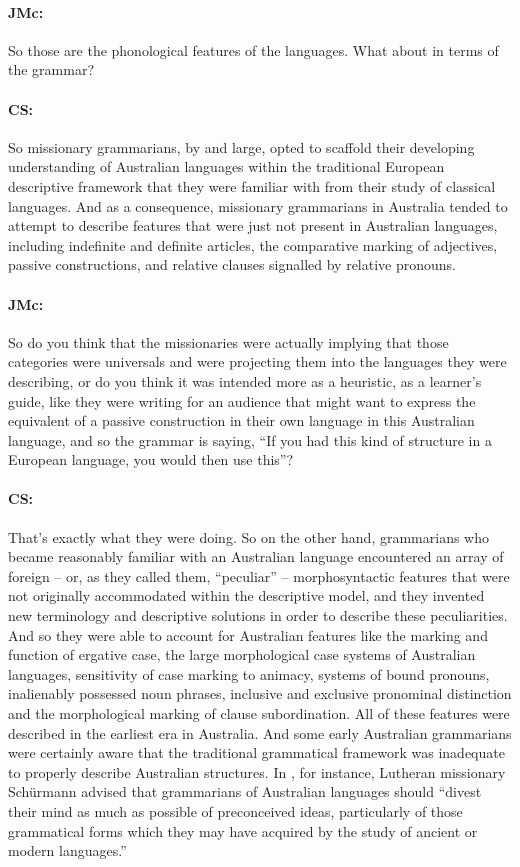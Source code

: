 \documentclass[output=paper]{langscibook}
\begin{document}
\paragraph*{JMc:}  So those are the phonological features of the languages. What about in terms of the grammar?


\paragraph*{CS:}  So missionary grammarians, by and large, opted to scaffold their developing understanding of Australian languages within the traditional European descriptive framework that they were familiar with from their study of classical languages. And as a consequence, missionary grammarians in Australia tended to attempt to describe features that were just not present in Australian languages, including indefinite and definite articles, the comparative marking of adjectives, passive constructions, and relative clauses signalled by relative pronouns.


\paragraph*{JMc:}  So do you think that the missionaries were actually implying that those categories were universals and were projecting them into the languages they were describing, or do you think it was intended more as a heuristic, as a learner’s guide, like they were writing for an audience that might want to express the equivalent of a passive construction in their own language in this Australian language, and so the grammar is saying, “If you had this kind of structure in a European language, you would then use this”?


\paragraph*{CS:}  That’s exactly what they were doing. So on the other hand, grammarians who became reasonably familiar with an Australian language encountered an array of foreign – or, as they called them, “peculiar” – morphosyntactic features that were not originally accommodated within the descriptive model, and they invented new terminology and descriptive solutions in order to describe these peculiarities. And so they were able to account for Australian features like the marking and function of ergative case, the large morphological case systems of Australian languages, sensitivity of case marking to animacy, systems of bound pronouns, inalienably possessed noun phrases, inclusive and exclusive pronominal distinction and the morphological marking of clause subordination. All of these features were described in the earliest era in Australia. And some early Australian grammarians were certainly aware that the traditional grammatical framework was inadequate to properly describe Australian structures.  In \citeyear{schuermann1844a}, for instance, Lutheran missionary Schürmann advised that grammarians of Australian languages should “divest their mind as much as possible of preconceived ideas, particularly of those grammatical forms which they may have acquired by the study of ancient or modern languages.”
\end{document}
